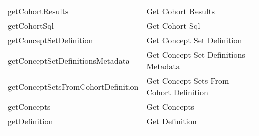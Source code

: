 \documentclass[
]{article}
\begin{document}
\begin{longtable}[]{@{}ll@{}}
\begin{minipage}[t]{0.46\columnwidth}\raggedright
getCohortResults\strut
\end{minipage} & \begin{minipage}[t]{0.48\columnwidth}\raggedright
Get Cohort Results\strut
\end{minipage}\tabularnewline
\begin{minipage}[t]{0.46\columnwidth}\raggedright
getCohortSql\strut
\end{minipage} & \begin{minipage}[t]{0.48\columnwidth}\raggedright
Get Cohort Sql\strut
\end{minipage}\tabularnewline
\begin{minipage}[t]{0.46\columnwidth}\raggedright
getConceptSetDefinition\strut
\end{minipage} & \begin{minipage}[t]{0.48\columnwidth}\raggedright
Get Concept Set Definition\strut
\end{minipage}\tabularnewline
\begin{minipage}[t]{0.46\columnwidth}\raggedright
getConceptSetDefinitionsMetadata\strut
\end{minipage} & \begin{minipage}[t]{0.48\columnwidth}\raggedright
Get Concept Set Definitions Metadata\strut
\end{minipage}\tabularnewline
\begin{minipage}[t]{0.46\columnwidth}\raggedright
getConceptSetsFromCohortDefinition\strut
\end{minipage} & \begin{minipage}[t]{0.48\columnwidth}\raggedright
Get Concept Sets From Cohort Definition\strut
\end{minipage}\tabularnewline
\begin{minipage}[t]{0.46\columnwidth}\raggedright
getConcepts\strut
\end{minipage} & \begin{minipage}[t]{0.48\columnwidth}\raggedright
Get Concepts\strut
\end{minipage}\tabularnewline
\begin{minipage}[t]{0.46\columnwidth}\raggedright
getDefinition\strut
\end{minipage} & \begin{minipage}[t]{0.48\columnwidth}\raggedright
Get Definition\strut
\end{minipage}\tabularnewline
\begin{minipage}[t]{0.46\columnwidth}\raggedright

\end{minipage}
\end{longtable}
\end{document}
